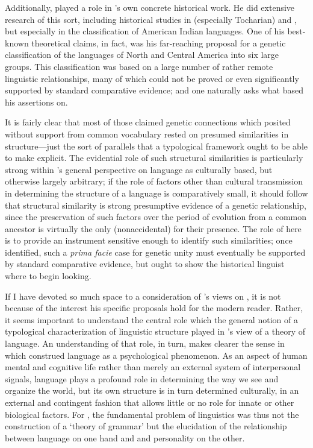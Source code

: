 Additionally,  played a role in {\Sapir}'s own concrete
historical work. He did extensive research of this sort, including
historical studies in  (especially Tocharian) and
, but especially in the classification of American Indian
languages. One of his best-known theoretical claims, in fact, was his
far-reaching proposal for a genetic classification of the languages of
North and Central America into six large groups. This classification
was based on a large number of rather remote linguistic relationships,
many of which could not be proved or even significantly supported by
standard comparative evidence; and one naturally asks what {\Sapir} based
his assertions on.

It is fairly clear that most of those claimed genetic connections
which {\Sapir} posited without support from common vocabulary rested on
presumed similarities in structure—just the sort of parallels that a
typological framework ought to be able to make explicit. The
evidential role of such structural similarities is particularly strong
within {\Sapir}'s general perspective on language as culturally based,
but otherwise largely arbitrary; if the role of factors other than
cultural transmission in determining the structure of a language is
comparatively small, it should follow that structural similarity is
strong presumptive evidence of a genetic relationship, since the
preservation of such factors over the period of evolution from a
common ancestor is virtually the only (nonaccidental)  for
their presence. The role of  here is to provide an instrument
sensitive enough to identify such similarities; once identified, such
a \emph{prima facie} case for genetic unity must eventually be
supported by standard comparative evidence, but  ought to show
the historical linguist where to begin looking.

If I have devoted so much space to a consideration of {\Sapir}'s views
on , it is not because of the interest his specific proposals
hold for the modern reader. Rather, it seems important to understand
the central role which the general notion of a typological
characterization of linguistic structure played in {\Sapir}'s view of a
theory of language. An understanding of that role, in turn, makes
clearer the sense in which {\Sapir} construed language as a psychological
phenomenon. As an aspect of human mental and cognitive life rather
than merely an external system of interpersonal signals, language
plays a profound role in determining the way we see and organize the
world, but its own structure is in turn determined culturally, in an
external and contingent fashion that allows little or no role for
innate or other biological factors. For {\Sapir}, the fundamental problem
of linguistics was thus not the construction of a `theory of grammar'
but the elucidation of the relationship between language on one hand
and  and personality on the other.

